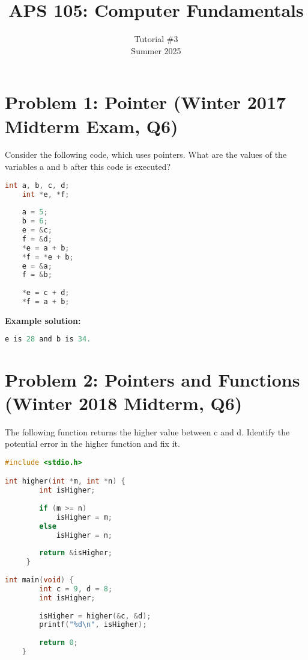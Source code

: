 \documentclass[12pt]{article}
\begin{document}
 
 
\title{APS 105: Computer Fundamentals}
\date{}
\author{Tutorial \#3\\ 
Summer 2025}

\maketitle

\section*{Problem 1: Pointer (Winter 2017  Midterm Exam, Q6)}
Consider the following code, which uses pointers. What are the values of the variables a and b after this code is executed?
\begin{lstlisting}[language=C]
	int a, b, c, d;
	int *e, *f;
	
	a = 5;
	b = 6;
	e = &c;
	f = &d;
	*e = a + b; 
	*f = *e + b;
	e = &a;
	f = &b;
	
	*e = c + d; 
	*f = a + b;
\end{lstlisting}

\textbf{Example solution:}
\begin{lstlisting}[language=C]
e is 28 and b is 34.
\end{lstlisting}
\section*{Problem 2: Pointers and Functions (Winter 2018 Midterm, Q6)}

The following function returns the higher value between c and d. Identify the potential error in the higher function and fix it.

\begin{lstlisting}[language=C]
#include <stdio.h>

int higher(int *m, int *n) {
		int isHigher;
		
		if (m >= n)
			isHigher = m;
		else
			isHigher = n;
			
		return &isHigher;
	 }
 
int main(void) {
		int c = 9, d = 8;
		int isHigher;
		
		isHigher = higher(&c, &d); 
		printf("%d\n", isHigher);
		
		return 0;
	}
\end{lstlisting}
\end{document}
